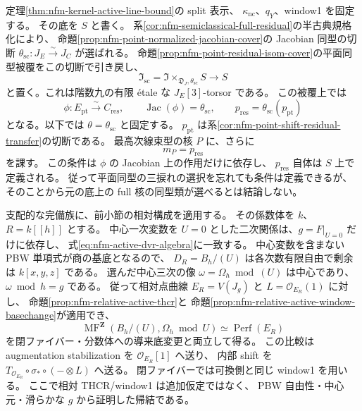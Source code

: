 定理\ref{thm:nfm-kernel-active-line-bound}の split 表示、
$\kappa_{\mathrm{nc}}$、$q_Y$、window1 を固定する。
その底を $S$ と書く。
系\ref{cor:nfm-semiclassical-full-residual}の半古典規格化により、
命題\ref{prop:nfm-point-normalized-jacobian-cover}の Jacobian 同型の切断
$\theta_{\mathrm{sc}}:J_E\xrightarrow{\sim}J_C$ が選ばれる。
命題\ref{prop:nfm-point-residual-isom-cover}の平面同型被覆をこの切断で引き戻し、
\[
 \mathfrak I_{\mathrm{sc}}
   =\mathfrak I\times_{\mathfrak D_J,\theta_{\mathrm{sc}}}S
   \longrightarrow S
\]
と置く。これは階数九の有限 \'etale な $J_E[3]$-torsor である。
この被覆上では
\[
 \phi:E_{\mathrm{pt}}\xrightarrow{\sim}C_{\mathrm{res}},\qquad
 \operatorname{Jac}(\phi)=\theta_{\mathrm{sc}},\qquad
 p_{\mathrm{res}}=\theta_{\mathrm{sc}}(p_{\mathrm{pt}})
\]
となる。以下では $\theta=\theta_{\mathrm{sc}}$ と固定する。
$p_{\mathrm{pt}}$ は系\ref{cor:nfm-point-shift-residual-transfer}の切断である。
最高次線束型の核 $P$ に、さらに
\begin{equation}
\label{eq:nfm-kernel-point-line-type}
 m_P=p_{\mathrm{res}}
\end{equation}
を課す。
この条件は $\phi$ の Jacobian 上の作用だけに依存し、
$p_{\mathrm{res}}$ 自体は $S$ 上で定義される。
従って平面同型の三捩れの選択を忘れても条件は定義できるが、
そのことから元の底上の full 核の同型類が選べるとは結論しない。

支配的な完備族に、前小節の相対構成を適用する。
その係数体を $k$、$R=k[[h]]$ とする。
中心一次変数を $U=0$ とした二次関係は、$g=F|_{U=0}$ だけに依存し、
式\eqref{eq:nfm-active-dvr-algebra}に一致する。
中心変数を含まない PBW 単項式が商の基底となるので、
$D_R=B_h/(U)$ は各次数有限自由で剰余は $k[x,y,z]$ である。
選んだ中心三次の像 $\omega=\Omega_h\bmod(U)$ は中心であり、$\omega\bmod h=g$ である。
従って相対点曲線 $E_R=V(J_g)$ と $L=\mathcal O_{E_R}(1)$ に対し、
命題\ref{prop:nfm-relative-active-thcr}と
命題\ref{prop:nfm-relative-active-window-basechange}が適用でき、
\begin{equation}
\label{eq:nfm-relative-elliptic-window-comparison}
 \operatorname{MF}^{\mathbf Z}(B_h/(U),\Omega_h\bmod U)
 \simeq\operatorname{Perf}(E_R)
\end{equation}
を閉ファイバー・分数体への導来底変更と両立して得る。
この比較は augmentation stabilization を $\mathcal O_{E_R}[1]$ へ送り、
内部 shift を $T_{\mathcal O_{E_R}}\circ\sigma_*\circ(-\otimes L)$ へ送る。
閉ファイバーでは可換側と同じ window1 を用いる。
ここで相対 THCR/window1 は追加仮定ではなく、
PBW 自由性・中心元・滑らかな $g$ から証明した帰結である。

